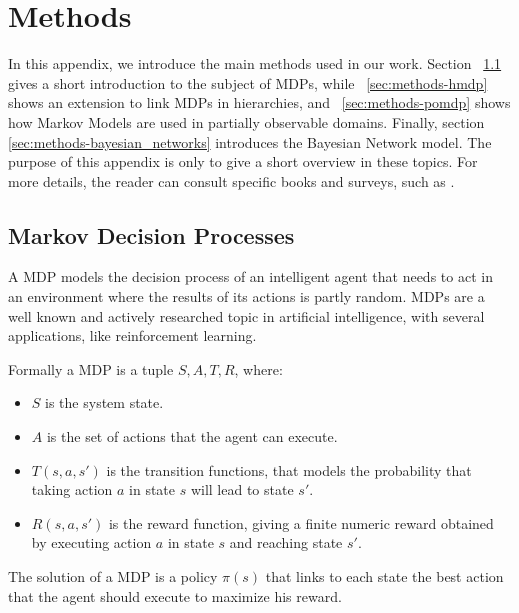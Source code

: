 
\chapter{Methods} %

\label{appendix-methods} %


In this appendix, we introduce the main methods used in our work. Section ~\ref{sec:methods-mdp} gives a short introduction to the subject of MDPs, while ~\ref{sec:methods-hmdp} shows an extension to link MDPs in hierarchies, and ~\ref{sec:methods-pomdp} shows how Markov Models are used in partially observable domains. Finally, section \ref{sec:methods-bayesian_networks} introduces the Bayesian Network model. The purpose of this appendix is only to give a short overview in these topics. For more details, the reader can consult specific books and surveys, such as \cite{2012Mausam}.
  
\section{Markov Decision Processes}
\label{sec:methods-mdp}
A MDP models the decision process of an intelligent agent that needs to act in an environment where the results of its actions is partly random. MDPs are a well known and actively researched topic in artificial intelligence, with several applications, like reinforcement learning.

Formally a MDP is a tuple $S,A,T,R$, where: 
\begin{itemize}
\item $S$ is the system state.
\item $A$ is the set of actions that the agent can execute.
\item $T(s,a,s')$ is the transition functions, that models the probability that taking action $a$ in state $s$ will lead to state $s'$.
\item $R(s,a,s')$ is the reward function, giving a finite numeric reward obtained by executing action $a$ in state $s$ and reaching state $s'$.
\end{itemize}

The solution of a MDP is a policy $\pi(s)$ that links to each state the best action that the agent should execute to maximize his reward.

